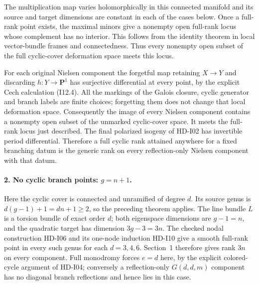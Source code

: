 The multiplication map varies holomorphically in this connected
manifold and its source and target dimensions are constant in each
of the cases below.  Once a full-rank point exists, the maximal minors
give a nonempty open full-rank locus whose complement has no interior.
This follows from the identity theorem in local vector-bundle frames
and connectedness.  Thus every nonempty open subset of the full
cyclic-cover deformation space meets this locus.

For each original Nielsen component the forgetful map retaining
$X\to Y$ and discarding $h:Y\to\mathbf P^1$ has surjective differential
at every point, by the explicit Cech calculation (I12.4).  All the
markings of the Galois closure, cyclic generator and branch labels are
finite choices; forgetting them does not change that local deformation
space.  Consequently the image of every Nielsen component contains
a nonempty open subset of the unmarked cyclic-cover space.  It meets
the full-rank locus just described.  The final polarized isogeny of
HD-I02 has invertible period differential.  Therefore a full cyclic
rank attained anywhere for a fixed branching datum is the generic
rank on every reflection-only Nielsen component with that datum.

\paragraph{2. No cyclic branch points: $g=n+1$.}
Here the cyclic cover is connected and unramified of degree $d$.
Its source genus is $d(g-1)+1=dn+1\geq2$, so the preceding theorem
applies.  The line bundle $L$ is a torsion bundle of exact order $d$;
both eigenspace dimensions are $g-1=n$, and the quadratic target has
dimension $3g-3=3n$.
The checked nodal construction HD-I06 and its one-node induction
HD-I10 give a smooth full-rank point in every such genus for each
$d=3,4,6$.  Section~1 therefore gives rank $3n$ on every component.
Full monodromy forces $e=d$ here, by the explicit colored-cycle
argument of HD-I04; conversely a reflection-only $G(d,d,m)$ component
has no diagonal branch reflections and hence lies in this case.

